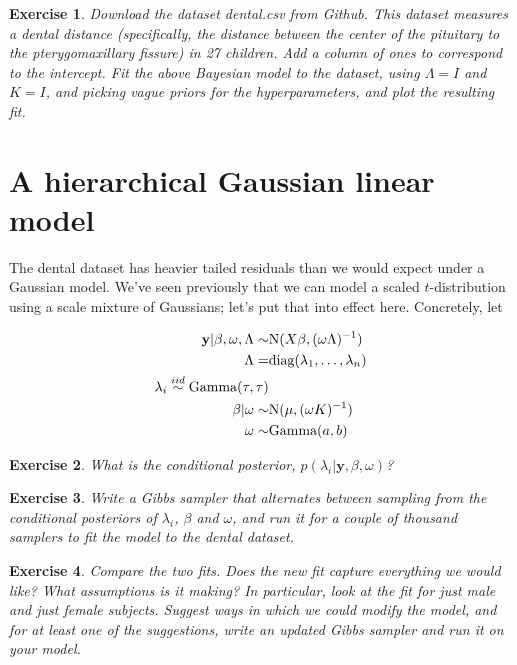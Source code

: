 \documentclass[twoside]{article}
\newcounter{lecnum}
\newtheorem{exercise}{Exercise}[lecnum]
\begin{document}
\begin{exercise}
  Download the dataset dental.csv from Github. This dataset measures a dental distance (specifically, the distance between the center of the pituitary to the pterygomaxillary fissure) in 27 children. Add a column of ones to correspond to the intercept. Fit the above Bayesian model to the dataset, using $\Lambda=I$ and $K=I$, and picking vague priors for the hyperparameters, and plot the resulting fit.
\end{exercise}



\section{A hierarchical Gaussian linear model}
The dental dataset has heavier tailed residuals than we would expect under a Gaussian model. We've seen previously that we can model a scaled $t$-distribution using a scale mixture of Gaussians; let's put that into effect here. Concretely, let

$$\begin{aligned}
  \mathbf{y}|\beta,\omega,\Lambda \sim& \mbox{N}(X\beta, (\omega \Lambda)^{-1})\\
  \Lambda =& \mbox{diag}(\lambda_1,\dots, \lambda_n)\\
  \lambda_i \stackrel{\small{iid}}{\sim} \mbox{Gamma}(\tau,\tau)\\
  \beta|\omega \sim& \mbox{N}(\mu, (\omega K)^{-1})\\
  \omega \sim& \mbox{Gamma}(a,b)
\end{aligned}$$

\begin{exercise}
  What is the conditional posterior, $p(\lambda_i|\mathbf{y},\beta, \omega)$?
\end{exercise}

\begin{exercise}
  Write a Gibbs sampler that alternates between sampling from the conditional posteriors of $\lambda_i$, $\beta$ and $\omega$, and run it for a couple of thousand samplers to fit the model to the dental dataset. 
\end{exercise}

\begin{exercise}
  Compare the two fits. Does the new fit capture everything we would like? What assumptions is it making? In particular, look at the fit for just male and just female subjects. Suggest ways in which we could modify the model, and for at least one of the suggestions, write an updated Gibbs sampler and run it on your model.
\end{exercise}
  
  
\end{document}
